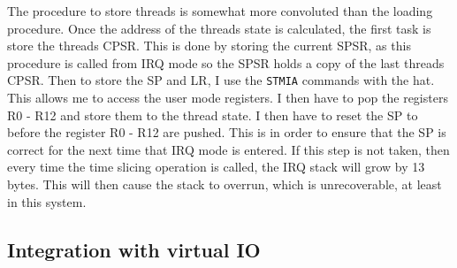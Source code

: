 The procedure to store threads is somewhat more convoluted than the loading procedure. Once the address of the threads state is calculated, the first task is store the threads CPSR. This is done by storing the current SPSR, as this procedure is called from IRQ mode so the SPSR holds a copy of the last threads CPSR. Then to store the SP and LR, I use the \verb|STMIA| commands with the hat. This allows me to access the user mode registers. I then have to pop the registers R0 - R12 and store them to the thread state. I then have to reset the SP to before the register R0 - R12 are pushed. This is in order to ensure that the SP is correct for the next time that IRQ mode is entered. If this step is not taken, then every time the time slicing operation is called, the IRQ stack will grow by 13 bytes. This will then cause the stack to overrun, which is unrecoverable, at least in this system.


\subsection{Integration with virtual IO}
























